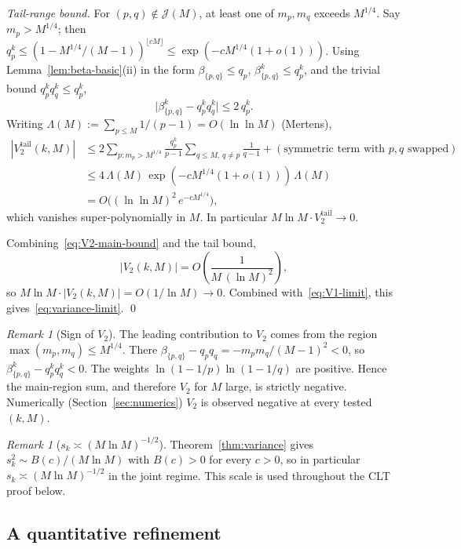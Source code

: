 \documentclass[11pt]{article}
\theoremstyle{remark}
\newtheorem{remark}[theorem]{Remark}
\begin{document}
\emph{Tail-range bound.}
For $(p,q) \notin \mathcal{J}(M)$, at least one of $m_p, m_q$ exceeds $M^{1/4}$. Say $m_p > M^{1/4}$; then $q_p^k \leq (1 - M^{1/4}/(M-1))^{\lfloor cM \rfloor} \leq \exp(-c M^{1/4}(1+o(1)))$. Using Lemma~\ref{lem:beta-basic}(ii) in the form $\beta_{\{p,q\}} \leq q_p$, $\beta_{\{p,q\}}^k \leq q_p^k$, and the trivial bound $q_p^k q_q^k \leq q_p^k$,
\[
\bigl|\beta_{\{p,q\}}^k - q_p^k q_q^k\bigr| \leq 2\, q_p^k.
\]
Writing $\Lambda(M) := \sum_{p \leq M} 1/(p-1) = O(\ln \ln M)$ (Mertens),
\begin{align*}
|V_2^{\mathrm{tail}}(k, M)| &\leq 2 \sum_{p \colon m_p > M^{1/4}} \frac{q_p^k}{p-1} \sum_{q \leq M,\, q \neq p} \frac{1}{q-1} + (\text{symmetric term with }p, q\text{ swapped})\\
&\leq 4\, \Lambda(M)\, \exp(-c M^{1/4}(1+o(1)))\, \Lambda(M)\\
&= O\bigl((\ln \ln M)^2\, e^{-c M^{1/4}}\bigr),
\end{align*}
which vanishes super-polynomially in $M$. In particular $M \ln M \cdot V_2^{\mathrm{tail}} \to 0$.

Combining~\eqref{eq:V2-main-bound} and the tail bound,
\begin{equation}\label{eq:V2-total-bound}
|V_2(k, M)| = O\!\left(\frac{1}{M\,(\ln M)^2}\right),
\end{equation}
so $M \ln M \cdot |V_2(k, M)| = O(1/\ln M) \to 0$. Combined with~\eqref{eq:V1-limit}, this gives~\eqref{eq:variance-limit}. \qed

\begin{remark}[Sign of $V_2$]\label{rem:V2-sign}
The leading contribution to $V_2$ comes from the region $\max(m_p, m_q) \leq M^{1/4}$. There $\beta_{\{p,q\}} - q_p q_q = -m_p m_q/(M-1)^2 < 0$, so $\beta_{\{p,q\}}^k - q_p^k q_q^k < 0$. The weights $\ln(1-1/p)\ln(1-1/q)$ are positive. Hence the main-region sum, and therefore $V_2$ for $M$ large, is strictly negative. Numerically (Section~\ref{sec:numerics}) $V_2$ is observed negative at every tested $(k, M)$.
\end{remark}

\begin{remark}[$s_k \asymp (M \ln M)^{-1/2}$]\label{rem:sk-asymp}
Theorem~\ref{thm:variance} gives $s_k^2 \sim B(c)/(M \ln M)$ with $B(c) > 0$ for every $c > 0$, so in particular $s_k \asymp (M \ln M)^{-1/2}$ in the joint regime. This scale is used throughout the CLT proof below.
\end{remark}

\subsection{A quantitative refinement}\label{sec:variance-rate}
\end{document}
